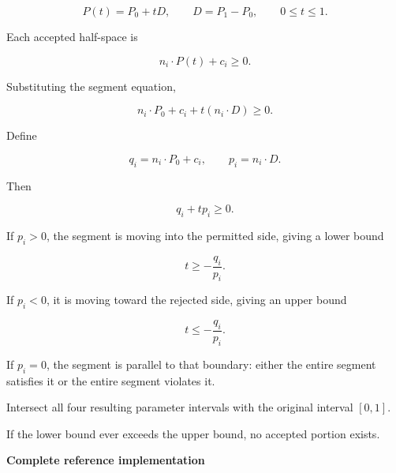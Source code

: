 \[
P(t)=P_0+tD,\qquad D=P_1-P_0,\qquad 0\le t\le1.
\]

Each accepted half-space is

\[
n_i\cdot P(t)+c_i\ge0.
\]

Substituting the segment equation,

\[
n_i\cdot P_0+c_i+t(n_i\cdot D)\ge0.
\]

Define

\[
q_i=n_i\cdot P_0+c_i,\qquad p_i=n_i\cdot D.
\]

Then

\[
q_i+t p_i\ge0.
\]

If \(p_i>0\), the segment is moving into the permitted side, giving a lower bound

\[
t\ge-\frac{q_i}{p_i}.
\]

If \(p_i<0\), it is moving toward the rejected side, giving an upper bound

\[
t\le-\frac{q_i}{p_i}.
\]

If \(p_i=0\), the segment is parallel to that boundary: either the entire segment satisfies it or the entire segment violates it.

Intersect all four resulting parameter intervals with the original interval \([0,1]\).

If the lower bound ever exceeds the upper bound, no accepted portion exists.

\textbf{Complete reference implementation}

